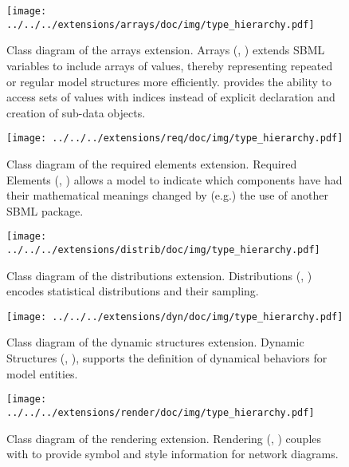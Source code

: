 \begin{figure}[H]
 \centering
\texttt{[image: ../../../extensions/arrays/doc/img/type\_hierarchy.pdf]}
 \vspace*{-4em}
 \caption[Class diagram of the arrays extension]{Class diagram of the arrays extension. Arrays (, \cite{Watanabe2013}) extends SBML variables to include arrays of values,
thereby representing repeated or regular model structures more efficiently.
 provides the ability to access sets of values with indices instead of explicit
declaration and creation of sub-data objects.}
 \label{fig:arrays}
\end{figure}


\begin{figure}[H]
 \centering
\texttt{[image: ../../../extensions/req/doc/img/type\_hierarchy.pdf]}
 \vspace*{-3em}
 \caption[Class diagram of the required elements extension]{Class diagram of the required elements extension. Required Elements (, \cite{Smith2013}) allows a model to indicate which
components have had their mathematical meanings changed by (e.g.) the use of
another SBML package.}
 \label{fig:req}
\end{figure}


\begin{figure}[H]
 \centering
\texttt{[image: ../../../extensions/distrib/doc/img/type\_hierarchy.pdf]}
 \vspace*{-3em}
 \caption[Class diagram of the distributions extension.]{ Class diagram of the distributions extension. Distributions 
 (, \cite{Moodie2013}) encodes statistical distributions and their sampling.}
 \label{fig:distrib}
\end{figure}


\begin{figure}[H]
 \vspace*{-2em}
 \centering
\texttt{[image: ../../../extensions/dyn/doc/img/type\_hierarchy.pdf]}
 \vspace*{-4em}
 \caption[Class diagram of the dynamic structures extension]{Class diagram of the dynamic structures extension. Dynamic Structures (, \cite{Gomez2014}), supports the definition of dynamical behaviors for model entities.
}
 \label{fig:dyn}
\end{figure}


\begin{figure}[H]
 \vspace*{-3em}
 \centering
\texttt{[image: ../../../extensions/render/doc/img/type\_hierarchy.pdf]}
 \vspace*{-3em}
 \caption[Class diagram of the rendering extension.]{Class diagram of the rendering extension. Rendering (, \cite{gauges2006}) couples with \cite{Layout} to provide symbol and style information for network diagrams.}
 \label{fig:render}
\end{figure}

